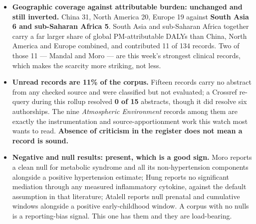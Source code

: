 \documentclass[10pt]{article}
\begin{document}
\begin{itemize}
\item \textbf{Geographic coverage against attributable burden: unchanged and still
inverted.} China 31, North America 20, Europe 19 against \textbf{South Asia 6 and
sub-Saharan Africa 5}. South Asia and sub-Saharan Africa together carry a far larger share
of global PM-attributable DALYs than China, North America and Europe combined, and
contributed 11 of 134 records. Two of those 11 --- Mandal and Moro --- are this week's
strongest clinical records, which makes the scarcity more striking, not less.

\item \textbf{Unread records are 11\% of the corpus.} Fifteen records carry no abstract
from any checked source and were classified but not evaluated; a Crossref re-query during
this rollup resolved \textbf{0 of 15} abstracts, though it did resolve six authorships.
The nine \textit{Atmospheric Environment} records among them are exactly the
instrumentation and source-apportionment work this watch most wants to read.
\textbf{Absence of criticism in the register does not mean a record is sound.}

\item \textbf{Negative and null results: present, which is a good sign.} Moro reports a
clean null for metabolic syndrome and all its non-hypertension components alongside a
positive hypertension estimate; Hung reports no significant mediation through any measured
inflammatory cytokine, against the default assumption in that literature; Atalell reports
null prenatal and cumulative windows alongside a positive early-childhood window. A corpus
with no nulls is a reporting-bias signal. This one has them and they are load-bearing.
\end{itemize}
\end{document}
